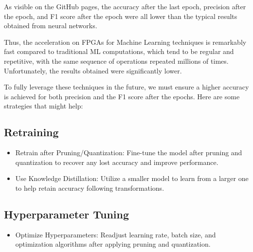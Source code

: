 \documentclass{article}
\begin{document}
As visible on the GitHub pages, the accuracy after the last epoch, precision after the epoch, and F1 score after the epoch were all lower than the typical results obtained from neural networks. 

Thus, the acceleration on FPGAs for Machine Learning techniques is remarkably fast compared to traditional ML computations, which tend to be regular and repetitive, with the same sequence of operations repeated millions of times. Unfortunately, the results obtained were significantly lower.

To fully leverage these techniques in the future, we must ensure a higher accuracy is achieved for both precision and the F1 score after the epochs. Here are some strategies that might help:

\subsection{Retraining}

\begin{itemize}
    \item Retrain after Pruning/Quantization: Fine-tune the model after pruning and quantization to recover any lost accuracy and improve performance.
    \item Use Knowledge Distillation: Utilize a smaller model to learn from a larger one to help retain accuracy following transformations.
\end{itemize}

\subsection{Hyperparameter Tuning}

\begin{itemize}
    \item Optimize Hyperparameters: Readjust learning rate, batch size, and optimization algorithms after applying pruning and quantization.
\end{itemize}
\end{document}
